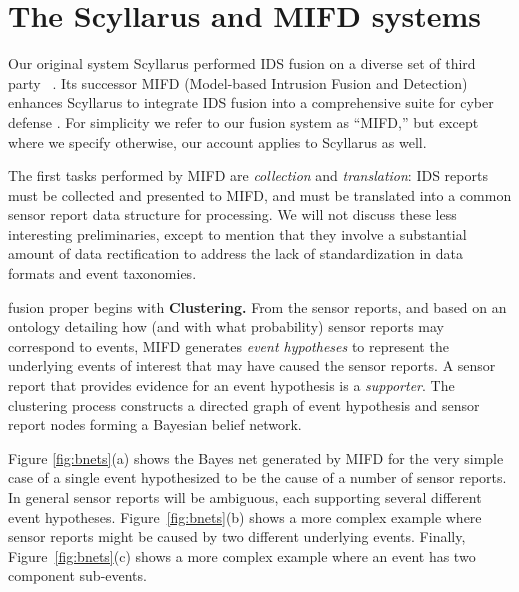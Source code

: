 \section{The Scyllarus and MIFD systems}
\label{sec:mifd}

Our original system Scyllarus
performed IDS
fusion on a diverse set of third party \idses~\cite{goldman:discex2001}.
Its successor
MIFD (Model-based Intrusion Fusion and Detection)
enhances Scyllarus
 to integrate
IDS fusion into a comprehensive suite for cyber defense
.
For simplicity we refer to our \ids fusion system as ``MIFD,'' but
except where we specify otherwise, our account applies to Scyllarus as well.

The first tasks performed by MIFD are
\emph{collection} and \emph{translation}: IDS reports
must be collected and presented to MIFD, and
must be translated into a common
sensor report data structure for processing.
We will not discuss these less interesting
preliminaries, except to mention that they
involve a substantial amount of data rectification
 to address the lack of standardization in data formats and event taxonomies.

{\ids} fusion proper begins with
\textbf{Clustering.} From the
sensor reports,
and based on an ontology detailing how (and with what probability)
sensor reports may correspond to events,
MIFD generates \emph{event hypotheses} to represent the
underlying events of interest that may have caused the sensor reports.  A
sensor report that provides evidence for an event hypothesis is a
\emph{supporter}.
The clustering process constructs a
directed graph of event hypothesis and sensor report nodes forming a
Bayesian belief network.

Figure \ref{fig:bnets}(a) shows the Bayes net generated by MIFD for
the very simple case of a single event hypothesized to be the cause of
a number of sensor reports.  In general sensor reports will be
ambiguous, each supporting several different event hypotheses.
Figure~\ref{fig:bnets}(b) shows a more complex example where sensor reports
might be caused by two different underlying events.
Finally, Figure~\ref{fig:bnets}(c) shows a more complex example where an event
has two component sub-events.

